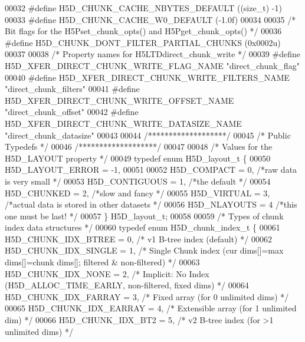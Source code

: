 \begin{DoxyCode}
00032 \textcolor{preprocessor}{#define H5D\_CHUNK\_CACHE\_NBYTES\_DEFAULT      ((size\_t) -1)}
00033 \textcolor{preprocessor}{#define H5D\_CHUNK\_CACHE\_W0\_DEFAULT          (-1.0f)}
00034 
00035 \textcolor{comment}{/* Bit flags for the H5Pset\_chunk\_opts() and H5Pget\_chunk\_opts() */}
00036 \textcolor{preprocessor}{#define H5D\_CHUNK\_DONT\_FILTER\_PARTIAL\_CHUNKS      (0x0002u)}
00037 
00038 \textcolor{comment}{/* Property names for H5LTDdirect\_chunk\_write */}   
00039 \textcolor{preprocessor}{#define H5D\_XFER\_DIRECT\_CHUNK\_WRITE\_FLAG\_NAME           "direct\_chunk\_flag"}
00040 \textcolor{preprocessor}{#define H5D\_XFER\_DIRECT\_CHUNK\_WRITE\_FILTERS\_NAME    "direct\_chunk\_filters"}
00041 \textcolor{preprocessor}{#define H5D\_XFER\_DIRECT\_CHUNK\_WRITE\_OFFSET\_NAME     "direct\_chunk\_offset"}
00042 \textcolor{preprocessor}{#define H5D\_XFER\_DIRECT\_CHUNK\_WRITE\_DATASIZE\_NAME   "direct\_chunk\_datasize"}
00043  
00044 \textcolor{comment}{/*******************/}
00045 \textcolor{comment}{/* Public Typedefs */}
00046 \textcolor{comment}{/*******************/}
00047 
00048 \textcolor{comment}{/* Values for the H5D\_LAYOUT property */}
00049 \textcolor{keyword}{typedef} \textcolor{keyword}{enum} H5D\_layout\_t \{
00050     H5D\_LAYOUT\_ERROR    = -1,
00051 
00052     H5D\_COMPACT     = 0,    \textcolor{comment}{/*raw data is very small             */}
00053     H5D\_CONTIGUOUS  = 1,    \textcolor{comment}{/*the default                    */}
00054     H5D\_CHUNKED     = 2,    \textcolor{comment}{/*slow and fancy                 */}
00055     H5D\_VIRTUAL         = 3,    \textcolor{comment}{/*actual data is stored in other datasets     */}
00056     H5D\_NLAYOUTS    = 4 \textcolor{comment}{/*this one must be last!             */}
00057 \} H5D\_layout\_t;
00058 
00059 \textcolor{comment}{/* Types of chunk index data structures */}
00060 \textcolor{keyword}{typedef} \textcolor{keyword}{enum} H5D\_chunk\_index\_t \{
00061     H5D\_CHUNK\_IDX\_BTREE = 0,    \textcolor{comment}{/* v1 B-tree index (default)                */}
00062     H5D\_CHUNK\_IDX\_SINGLE = 1,   \textcolor{comment}{/* Single Chunk index (cur dims[]=max dims[]=chunk dims[]; filtered &
       non-filtered) */}
00063     H5D\_CHUNK\_IDX\_NONE = 2,     \textcolor{comment}{/* Implicit: No Index (H5D\_ALLOC\_TIME\_EARLY, non-filtered, fixed dims) */}
00064     H5D\_CHUNK\_IDX\_FARRAY = 3,   \textcolor{comment}{/* Fixed array (for 0 unlimited dims)       */}
00065     H5D\_CHUNK\_IDX\_EARRAY = 4,   \textcolor{comment}{/* Extensible array (for 1 unlimited dim)   */}
00066     H5D\_CHUNK\_IDX\_BT2 = 5,      \textcolor{comment}{/* v2 B-tree index (for >1 unlimited dims)  */}

\end{DoxyCode}
